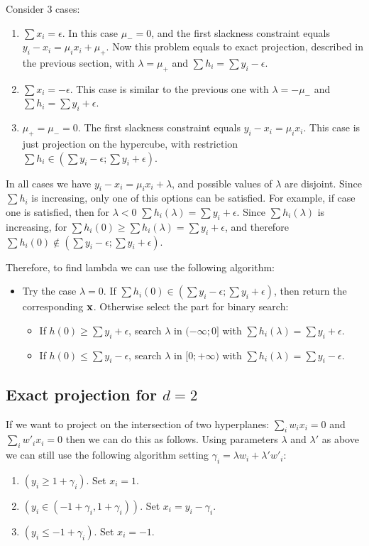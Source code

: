 Consider $3$ cases:
\begin{enumerate}
	\item $\sum x_i = \epsilon$. In this case $\mu_- = 0$, and the first slackness constraint equals $y_i - x_i = \mu_i x_i + \mu_+$. Now this problem equals to exact projection, described in the previous section, with $\lambda=\mu_+$ and $\sum h_i = \sum y_i - \epsilon$.
	\item $\sum x_i = -\epsilon$. This case is similar to the previous one with $\lambda=-\mu_-$ and $\sum h_i = \sum y_i + \epsilon$.
	\item $\mu_+ = \mu_- = 0$. The first slackness constraint equals $y_i - x_i = \mu_i x_i$. This case is just projection on the hypercube, with restriction $\sum h_i \in (\sum y_i - \epsilon; \sum y_i + \epsilon)$.
\end{enumerate}
In all cases we have $y_i - x_i = \mu_i x_i + \lambda$, and possible values of $\lambda$ are disjoint.
Since $\sum h_i$ is increasing, only one of this options can be satisfied.
For example, if case one is satisfied, then for $\lambda < 0$ $\sum h_i(\lambda) = \sum y_i + \epsilon$.
Since $\sum h_i(\lambda)$ is increasing, for $\sum h_i(0) \ge \sum h_i(\lambda) = \sum y_i + \epsilon$, and therefore $\sum h_i(0) \notin (\sum y_i - \epsilon; \sum y_i + \epsilon)$.

Therefore, to find lambda we can use the following algorithm:
\begin{itemize}
	\item Try the case $\lambda = 0$. If $\sum h_i(0) \in (\sum y_i - \epsilon; \sum y_i + \epsilon)$, then return the corresponding $\mathbf x$. Otherwise select the part for binary search:
	\begin{itemize}
		\item If $h(0) \ge \sum y_i + \epsilon$, search $\lambda$ in $(-\infty; 0]$ with $\sum h_i(\lambda) = \sum y_i + \epsilon$. 
		\item If $h(0) \le \sum y_i - \epsilon$, search $\lambda$ in $[0; +\infty)$ with $\sum h_i(\lambda) = \sum y_i - \epsilon$. 
	\end{itemize}
\end{itemize}


\subsection{Exact projection for $d = 2$}
If we want to project on the intersection of two hyperplanes: $\sum_i w_i x_i = 0$ and $\sum_i w'_i x_i = 0$ then we can do this as follows. 
Using parameters $\lambda$ and $\lambda'$ as above we can still use the following algorithm setting $\gamma_i = \lambda w_i + \lambda' w'_i$:
\begin{enumerate}
	\item $(y_i \ge 1 + \gamma_i)$. Set $x_i = 1$.
	\item $(y_i \in (-1 + \gamma_i, 1 + \gamma_i))$. Set $x_i = y_i - \gamma_i$.
	\item $(y_i \le -1 + \gamma_i)$. Set $x_i = -1$.
\end{enumerate}

